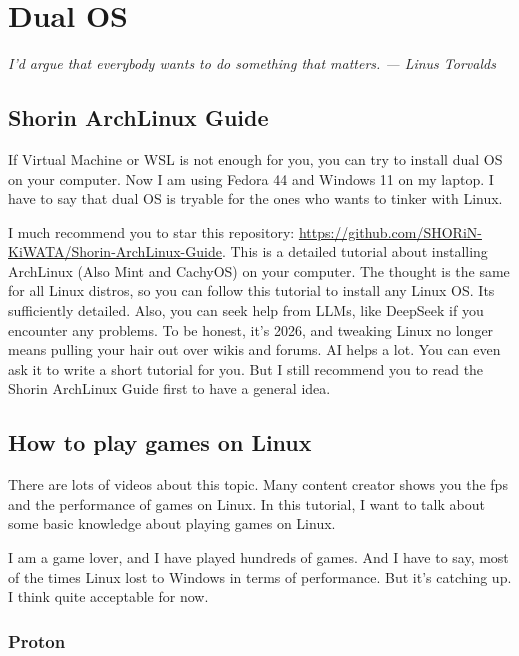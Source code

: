 \documentclass[lang=en,color=blue,12pt]{elegantbook}
\begin{document}
\chapter{Dual OS}

\begin{flushright}
\textit{I'd argue that everybody wants to do something that matters. --- Linus Torvalds}
\end{flushright}
\section{\textbf{Shorin ArchLinux Guide}}

If Virtual Machine or WSL is not enough for you, you can try to install dual
OS on your computer. Now I am using Fedora 44 and Windows 11 on my laptop.
I have to say that dual OS is tryable for the ones who wants to tinker with Linux.

I much recommend you to star this repository: \url{https://github.com/SHORiN-KiWATA/Shorin-ArchLinux-Guide}.
This is a detailed tutorial about installing ArchLinux (Also Mint and CachyOS) on your
computer. The thought is the same for all Linux distros, so you can follow this
tutorial to install any Linux OS. Its sufficiently detailed. Also, you can seek
help from LLMs, like DeepSeek if you encounter any problems. To be honest,
it's 2026, and tweaking Linux no longer means pulling your hair out over wikis
and forums. AI helps a lot. You can even ask it to write a short tutorial for you.
But I still recommend you to read the Shorin ArchLinux Guide first to have a
general idea.

\section{\textbf{How to play games on Linux}}

There are lots of videos about this topic. Many content creator shows you the fps
and the performance of games on Linux. In this tutorial, I want to talk about
some basic knowledge about playing games on Linux.

I am a game lover, and I have played hundreds of games. And I have to say,
most of the times Linux lost to Windows in terms of performance. But it's catching
up. I think quite acceptable for now.

\subsection{\textbf{Proton}}
\end{document}
